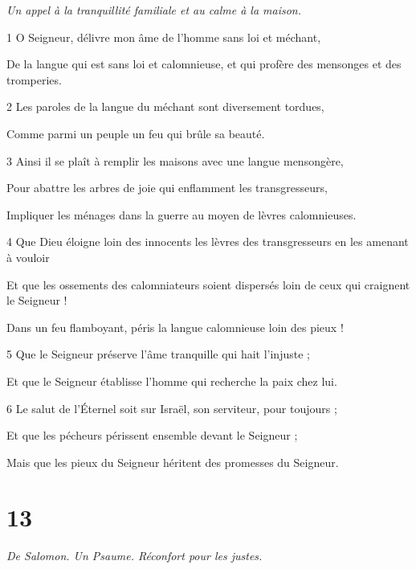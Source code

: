 \par \textit{Un appel à la tranquillité familiale et au calme à la maison.}

\par 1 O Seigneur, délivre mon âme de l'homme sans loi et méchant,
\par     De la langue qui est sans loi et calomnieuse, et qui profère des mensonges et des tromperies.
\par 2 Les paroles de la langue du méchant sont diversement tordues,
\par     Comme parmi un peuple un feu qui brûle sa beauté.
\par 3 Ainsi il se plaît à remplir les maisons avec une langue mensongère,
\par     Pour abattre les arbres de joie qui enflamment les transgresseurs,
\par     Impliquer les ménages dans la guerre au moyen de lèvres calomnieuses.
\par   
\par 4 Que Dieu éloigne loin des innocents les lèvres des transgresseurs en les amenant à vouloir
\par     Et que les ossements des calomniateurs soient dispersés loin de ceux qui craignent le Seigneur !
\par     Dans un feu flamboyant, péris la langue calomnieuse loin des pieux !
\par 5 Que le Seigneur préserve l'âme tranquille qui hait l'injuste ;
\par     Et que le Seigneur établisse l'homme qui recherche la paix chez lui.
\par 6 Le salut de l'Éternel soit sur Israël, son serviteur, pour toujours ;
\par     Et que les pécheurs périssent ensemble devant le Seigneur ;
\par     Mais que les pieux du Seigneur héritent des promesses du Seigneur.

\chapter{13}

\par \textit{De Salomon. Un Psaume. Réconfort pour les justes.}


